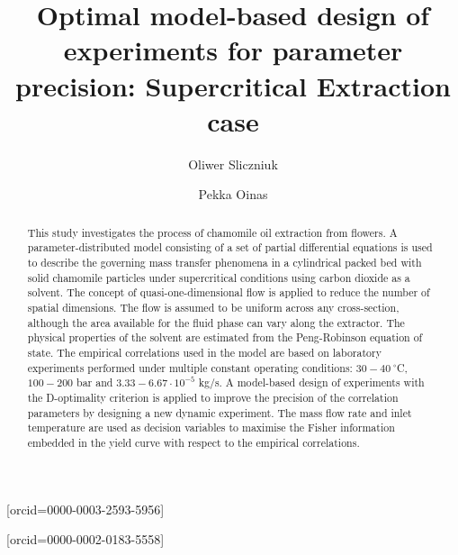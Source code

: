 \documentclass[a4paper,fleqn]{cas-dc}
\begin{document}
 

\title[mode=title]{Optimal model-based design of experiments for parameter precision: Supercritical Extraction case}                      


\author[1]{Oliwer Sliczniuk}[orcid=0000-0003-2593-5956]
\cormark[1]

\author[1]{Pekka Oinas}[orcid=0000-0002-0183-5558]


\address[1]{Aalto University, School of Chemical Engineering, Espoo, 02150, Finland}


\begin{abstract}
	This study investigates the process of chamomile oil extraction from flowers. A parameter-distributed model consisting of a set of partial differential equations is used to describe the governing mass transfer phenomena in a cylindrical packed bed with solid chamomile particles under supercritical conditions using carbon dioxide as a solvent. The concept of quasi-one-dimensional flow is applied to reduce the number of spatial dimensions. The flow is assumed to be uniform across any cross-section, although the area available for the fluid phase can vary along the extractor. The physical properties of the solvent are estimated from the Peng-Robinson equation of state. The empirical correlations used in the model are based on laboratory experiments performed under multiple constant operating conditions: $30 - 40~^\circ$C, $100 - 200$ bar and $3.33-6.67 \cdot 10^{-5}$ kg/s. A model-based design of experiments with the D-optimality criterion is applied to improve the precision of the correlation parameters by designing a new dynamic experiment. The mass flow rate and inlet temperature are used as decision variables to maximise the Fisher information embedded in the yield curve with respect to the empirical correlations. 
	
\end{abstract}
\end{document}
